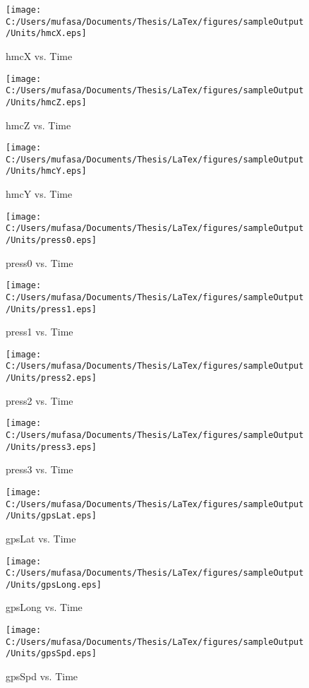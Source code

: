 \begin{figure}[H]
	\centering
	\caption{hmcX vs. Time}
		\texttt{[image: C:/Users/mufasa/Documents/Thesis/LaTex/figures/sampleOutput/Units/hmcX.eps]}
\end{figure}
\begin{figure}[H]
	\centering
	\caption{hmcZ vs. Time}
		\texttt{[image: C:/Users/mufasa/Documents/Thesis/LaTex/figures/sampleOutput/Units/hmcZ.eps]}
\end{figure}
\begin{figure}[H]
	\centering
	\caption{hmcY vs. Time}
		\texttt{[image: C:/Users/mufasa/Documents/Thesis/LaTex/figures/sampleOutput/Units/hmcY.eps]}
\end{figure}
\begin{figure}[H]
	\centering
	\caption{press0 vs. Time}
		\texttt{[image: C:/Users/mufasa/Documents/Thesis/LaTex/figures/sampleOutput/Units/press0.eps]}
\end{figure}
\begin{figure}[H]
	\centering
	\caption{press1 vs. Time}
		\texttt{[image: C:/Users/mufasa/Documents/Thesis/LaTex/figures/sampleOutput/Units/press1.eps]}
\end{figure}
\begin{figure}[H]
	\centering
	\caption{press2 vs. Time}
		\texttt{[image: C:/Users/mufasa/Documents/Thesis/LaTex/figures/sampleOutput/Units/press2.eps]}
\end{figure}
\begin{figure}[H]
	\centering
	\caption{press3 vs. Time}
		\texttt{[image: C:/Users/mufasa/Documents/Thesis/LaTex/figures/sampleOutput/Units/press3.eps]}
\end{figure}
\begin{figure}[H]
	\centering
	\caption{gpsLat vs. Time}
		\texttt{[image: C:/Users/mufasa/Documents/Thesis/LaTex/figures/sampleOutput/Units/gpsLat.eps]}
\end{figure}
\begin{figure}[H]
	\centering
	\caption{gpsLong vs. Time}
		\texttt{[image: C:/Users/mufasa/Documents/Thesis/LaTex/figures/sampleOutput/Units/gpsLong.eps]}
\end{figure}
\begin{figure}[H]
	\centering
	\caption{gpsSpd vs. Time}
		\texttt{[image: C:/Users/mufasa/Documents/Thesis/LaTex/figures/sampleOutput/Units/gpsSpd.eps]}
\end{figure}
